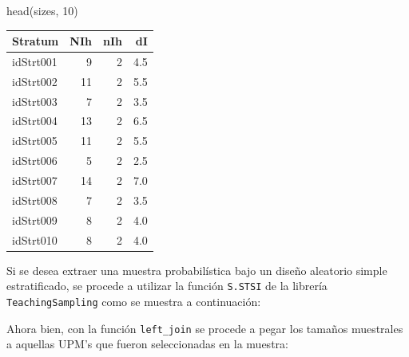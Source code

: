 \documentclass[
  12pt,
]{book}
\newenvironment{Shaded}{\begin{snugshade}}{\end{snugshade}}
\newcommand{\DecValTok}[1]{\textcolor[rgb]{0.00,0.00,0.81}{#1}}
\newcommand{\FunctionTok}[1]{\textcolor[rgb]{0.00,0.00,0.00}{#1}}
\newcommand{\NormalTok}[1]{#1}
\newcommand{\OtherTok}[1]{\textcolor[rgb]{0.56,0.35,0.01}{#1}}
\newcommand{\SpecialCharTok}[1]{\textcolor[rgb]{0.00,0.00,0.00}{#1}}
\begin{document}
\begin{Shaded}
\begin{Highlighting}[]
\FunctionTok{head}\NormalTok{(sizes, }\DecValTok{10}\NormalTok{)}
\end{Highlighting}
\end{Shaded}

\begin{tabular}{l|r|r|r}
\hline
Stratum & NIh & nIh & dI\\
\hline
idStrt001 & 9 & 2 & 4.5\\
\hline
idStrt002 & 11 & 2 & 5.5\\
\hline
idStrt003 & 7 & 2 & 3.5\\
\hline
idStrt004 & 13 & 2 & 6.5\\
\hline
idStrt005 & 11 & 2 & 5.5\\
\hline
idStrt006 & 5 & 2 & 2.5\\
\hline
idStrt007 & 14 & 2 & 7.0\\
\hline
idStrt008 & 7 & 2 & 3.5\\
\hline
idStrt009 & 8 & 2 & 4.0\\
\hline
idStrt010 & 8 & 2 & 4.0\\
\hline
\end{tabular}

Si se desea extraer una muestra probabilística bajo un diseño aleatorio simple estratificado, se procede a utilizar la función \texttt{S.STSI} de la librería \texttt{TeachingSampling} como se muestra a continuación:

\begin{Shaded}
\end{Shaded}

Ahora bien, con la función \texttt{left\_join} se procede a pegar los tamaños muestrales a aquellas UPM's que fueron seleccionadas en la muestra:

\begin{Shaded}
\end{Shaded}
\end{document}
